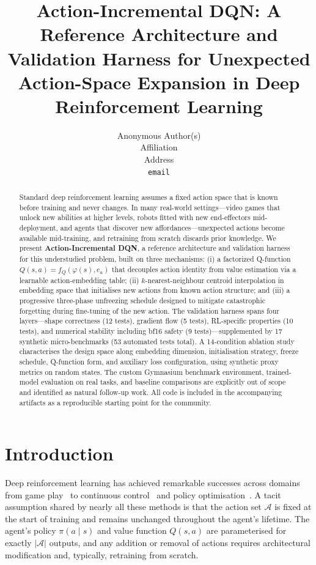 \documentclass{article}
\title{Action-Incremental DQN: A Reference Architecture and Validation Harness for Unexpected Action-Space Expansion in Deep Reinforcement Learning}
\author{%
  Anonymous Author(s) \\
  Affiliation \\
  Address \\
  \texttt{email} \\
}
\begin{document}
\maketitle

\begin{abstract}
Standard deep reinforcement learning assumes a fixed action space that is known before training and never changes. In many real-world settings---video games that unlock new abilities at higher levels, robots fitted with new end-effectors mid-deployment, and agents that discover new affordances---unexpected actions become available mid-training, and retraining from scratch discards prior knowledge. We present \textbf{Action-Incremental DQN}, a reference architecture and validation harness for this understudied problem, built on three mechanisms: (i) a factorized Q-function $Q(s,a) = f_Q(\varphi(s), e_a)$ that decouples action identity from value estimation via a learnable action-embedding table; (ii) $k$-nearest-neighbour centroid interpolation in embedding space that initialises new actions from known action structure; and (iii) a progressive three-phase unfreezing schedule designed to mitigate catastrophic forgetting during fine-tuning of the new action. The validation harness spans four layers---shape correctness (12 tests), gradient flow (5 tests), RL-specific properties (10 tests), and numerical stability including bf16 safety (9 tests)---supplemented by 17 synthetic micro-benchmarks (53 automated tests total). A 14-condition ablation study characterises the design space along embedding dimension, initialisation strategy, freeze schedule, Q-function form, and auxiliary loss configuration, using synthetic proxy metrics on random states. The custom Gymnasium benchmark environment, trained-model evaluation on real tasks, and baseline comparisons are explicitly out of scope and identified as natural follow-up work. All code is included in the accompanying artifacts as a reproducible starting point for the community.
\end{abstract}


\section{Introduction}

Deep reinforcement learning has achieved remarkable successes across domains from game play~\cite{mnih2015human} to continuous control~\cite{lillicrap2015continuous} and policy optimisation~\cite{schulman2017proximal}. A tacit assumption shared by nearly all these methods is that the action set $\mathcal{A}$ is fixed at the start of training and remains unchanged throughout the agent's lifetime. The agent's policy $\pi(a \mid s)$ and value function $Q(s,a)$ are parameterised for exactly $|\mathcal{A}|$ outputs, and any addition or removal of actions requires architectural modification and, typically, retraining from scratch.
\end{document}
